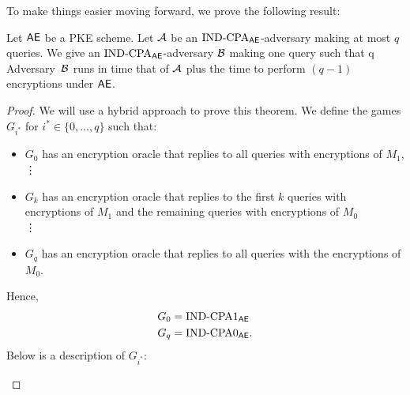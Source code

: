 \noindent To make things easier moving forward, we prove the following result:
\begin{thm}
Let $\textsf{AE}$ be a PKE scheme. Let ${\mathcal A}$ be an $\textnormal{IND-CPA}_{\textsf{AE}}$-adversary making at
most $q$ queries. We give an $\textnormal{IND-CPA}_{\textsf{AE}}$-adversary ${\mathcal B}$ making one query
such that
\bnm
  \AdvINDCPA{\AEnc}{\advA} \le q\cdotsm\AdvINDCPA{\AEnc}{\advB}
\enm
Adversary~${\mathcal B}$ runs in time that of ${\mathcal A}$ plus the time to perform $(q-1)$
encryptions under $\textsf{AE}$.
\end{thm}
\begin{proof}
We will use a hybrid approach to prove this theorem. We define the games $G_{i^*}$ for $i^*\in \{0, ..., q\}$ such that:
\begin{itemize}
\item $G_0$ has an encryption oracle that replies to all queries with encryptions of $M_1$,\\
\vdots
\item $G_k$ has an encryption oracle that replies to the first $k$ queries with encryptions of $M_1$ and the remaining queries with encryptions of $M_0$ \\
\vdots 
\item $G_q$ has an encryption oracle that replies to all queries with the encryptions of $M_0$.
\end{itemize}
Hence, 
\begin{align*}
G_0 &= \textnormal{IND-CPA}1_{\textsf{AE}}\\
G_q &= \textnormal{IND-CPA}0_{\textsf{AE}}.
\end{align*}
Below is a description of $G_{i^*}$:
\begin{center}
\end{center}


\end{proof}
